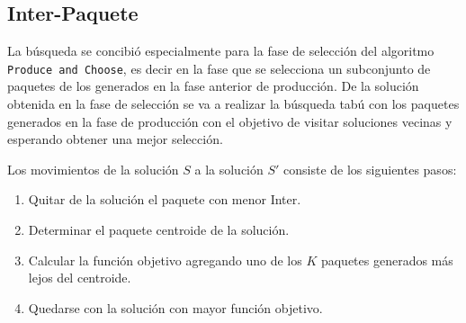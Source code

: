 \subsection{Inter-Paquete}
La búsqueda se concibió especialmente para la fase de selección del algoritmo \texttt{Produce and Choose}, es decir en la fase que se selecciona un subconjunto de paquetes de los generados en la fase anterior de producción. De la solución obtenida en la fase de selección se va a realizar la búsqueda tabú con los paquetes generados en la fase de producción con el objetivo de visitar soluciones vecinas y esperando obtener una mejor selección.

Los movimientos de la solución $S$ a la solución $S'$ consiste de los siguientes  pasos:
\begin{enumerate}
	\item Quitar de la solución el paquete con menor Inter.
	\item Determinar el paquete centroide de la solución.
	\item Calcular la función objetivo agregando uno de los $K$ paquetes generados más lejos del centroide.
	\item Quedarse con la solución con mayor función objetivo. 
\end{enumerate}

